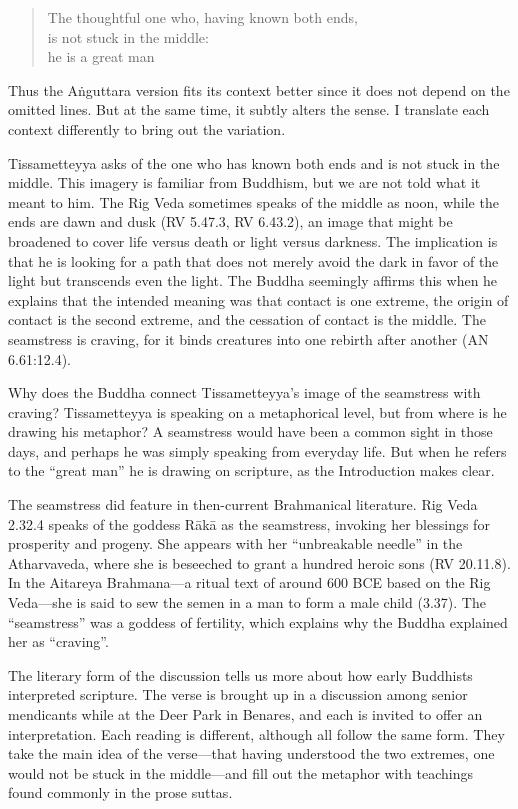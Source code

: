 \documentclass[12pt,openany]{book}%
\begin{document}
\begin{verse}%
The thoughtful one who, having known both ends, \\
is not stuck in the middle: \\
he is a great man

%
\end{verse}

Thus the \textsanskrit{Aṅguttara} version fits its context better since it does not depend on the omitted lines. But at the same time, it subtly alters the sense. I translate each context differently to bring out the variation.

Tissametteyya asks of the one who has known both ends and is not stuck in the middle. This imagery is familiar from Buddhism, but we are not told what it meant to him. The Rig Veda sometimes speaks of the middle as noon, while the ends are dawn and dusk (RV 5.47.3, RV 6.43.2), an image that might be broadened to cover life versus death or light versus darkness. The implication is that he is looking for a path that does not merely avoid the dark in favor of the light but transcends even the light. The Buddha seemingly affirms this when he explains that the intended meaning was that contact is one extreme, the origin of contact is the second extreme, and the cessation of contact is the middle. The seamstress is craving, for it binds creatures into one rebirth after another (AN 6.61:12.4).

Why does the Buddha connect Tissametteyya’s image of the seamstress with craving? Tissametteyya is speaking on a metaphorical level, but from where is he drawing his metaphor? A seamstress would have been a common sight in those days, and perhaps he was simply speaking from everyday life. But when he refers to the “great man” he is drawing on scripture, as the Introduction makes clear.

The seamstress did feature in then-current Brahmanical literature. Rig Veda 2.32.4 speaks of the goddess \textsanskrit{Rākā} as the seamstress, invoking her blessings for prosperity and progeny. She appears with her “unbreakable needle” in the Atharvaveda, where she is beseeched to grant a hundred heroic sons (RV 20.11.8). In the Aitareya Brahmana—a ritual text of around 600 BCE based on the Rig Veda—she is said to sew the semen in a man to form a male child (3.37). The “seamstress” was a goddess of fertility, which explains why the Buddha explained her as “craving”.

The literary form of the discussion tells us more about how early Buddhists interpreted scripture. The verse is brought up in a discussion among senior mendicants while at the Deer Park in Benares, and each is invited to offer an interpretation. Each reading is different, although all follow the same form. They take the main idea of the verse—that having understood the two extremes, one would not be stuck in the middle—and fill out the metaphor with teachings found commonly in the prose suttas.
\end{document}
